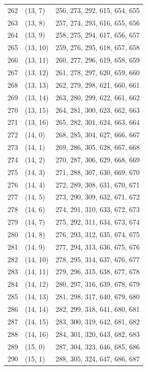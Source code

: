 \documentclass{article}
\begin{document}
\begin{longtable}{lll}
  262 & (13, 7) & 256, 273, 292, 615, 654, 655 \\
  263 & (13, 8) & 257, 274, 293, 616, 655, 656 \\
  264 & (13, 9) & 258, 275, 294, 617, 656, 657 \\
  265 & (13, 10) & 259, 276, 295, 618, 657, 658 \\
  266 & (13, 11) & 260, 277, 296, 619, 658, 659 \\
  267 & (13, 12) & 261, 278, 297, 620, 659, 660 \\
  268 & (13, 13) & 262, 279, 298, 621, 660, 661 \\
  269 & (13, 14) & 263, 280, 299, 622, 661, 662 \\
  270 & (13, 15) & 264, 281, 300, 623, 662, 663 \\
  271 & (13, 16) & 265, 282, 301, 624, 663, 664 \\
  272 & (14, 0) & 268, 285, 304, 627, 666, 667 \\
  273 & (14, 1) & 269, 286, 305, 628, 667, 668 \\
  274 & (14, 2) & 270, 287, 306, 629, 668, 669 \\
  275 & (14, 3) & 271, 288, 307, 630, 669, 670 \\
  276 & (14, 4) & 272, 289, 308, 631, 670, 671 \\
  277 & (14, 5) & 273, 290, 309, 632, 671, 672 \\
  278 & (14, 6) & 274, 291, 310, 633, 672, 673 \\
  279 & (14, 7) & 275, 292, 311, 634, 673, 674 \\
  280 & (14, 8) & 276, 293, 312, 635, 674, 675 \\
  281 & (14, 9) & 277, 294, 313, 636, 675, 676 \\
  282 & (14, 10) & 278, 295, 314, 637, 676, 677 \\
  283 & (14, 11) & 279, 296, 315, 638, 677, 678 \\
  284 & (14, 12) & 280, 297, 316, 639, 678, 679 \\
  285 & (14, 13) & 281, 298, 317, 640, 679, 680 \\
  286 & (14, 14) & 282, 299, 318, 641, 680, 681 \\
  287 & (14, 15) & 283, 300, 319, 642, 681, 682 \\
  288 & (14, 16) & 284, 301, 320, 643, 682, 683 \\
  289 & (15, 0) & 287, 304, 323, 646, 685, 686 \\
  290 & (15, 1) & 288, 305, 324, 647, 686, 687 \\

\end{longtable}
\end{document}
